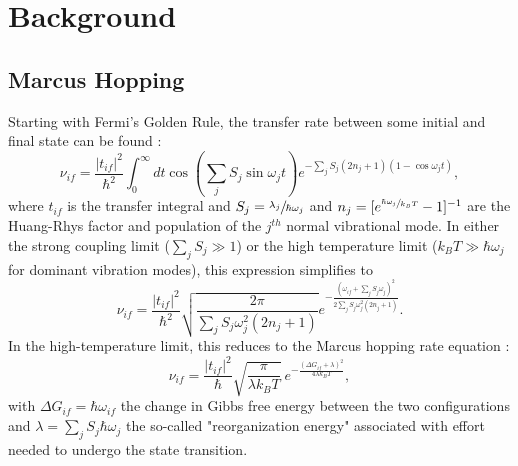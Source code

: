 \documentclass[11pt]{article}
\newcommand{\kt}{k_B T}
\begin{document}
\section{Background}

\subsection{Marcus Hopping}

Starting with Fermi's Golden Rule, the transfer rate between some initial and final state can be found \cite{jortner76, lin02, nan09}:
\begin{equation}
\nu_{if} = \frac{|t_{if}|^2}{\hbar^2} \int_0^\infty dt \cos \left(\sum_j S_j\sin \omega_jt \right) e^{-\sum_j S_j (2n_j+1)(1-\cos \omega_jt)},
\end{equation}
where $t_{if}$ is the transfer integral and $S_j = \sfrac{\lambda_j}{\hbar\omega_j}$ and $n_j = [e^{\sfrac{\hbar\omega_j}{\kt}}-1]^{-1}$ are the Huang-Rhys factor and population of the $j^{th}$ normal vibrational mode. In either the strong coupling limit ($\sum_j S_j \gg 1$) or the high temperature limit ($\kt \gg \hbar \omega_j$ for dominant vibration modes), this expression simplifies to \cite{shuai12}
\begin{equation}
\nu_{if} = \frac{|t_{if}|^2}{\hbar^2} \sqrt{\frac{2\pi}{\sum_j S_j \omega_j^2(2n_j+1)}} e^{-\frac{(\omega_{if}+\sum_j S_j \omega_j)^2}{2\sum_j S_j\omega_j^2(2n_j+1)}}.
\end{equation}
In the high-temperature limit, this reduces to the Marcus hopping rate equation \cite{marcus93}:
\begin{equation}
\nu_{if} = \frac{|t_{if}|^2}{\hbar} \sqrt{\frac{\pi}{\lambda \kt}} \: e^{-\frac{(\Delta G_{if}+\lambda)^2}{4\lambda \kt}},
\end{equation}
with $\Delta G_{if} = \hbar \omega_{if}$ the change in Gibbs free energy between the two configurations and $\lambda = \sum_j S_j \hbar \omega_j$ the so-called "reorganization energy" associated with effort needed to undergo the state transition.
\end{document}
